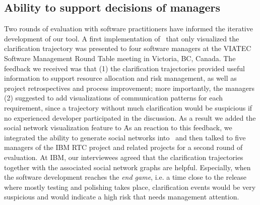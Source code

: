 \subsection{Ability to support decisions of managers}
Two rounds of evaluation with software practitioners have informed the iterative development of our tool. A first implementation of \viss\ that only visualized the clarification trajectory was presented to four software managers at the VIATEC Software Management Round Table meeting in Victoria, BC, Canada. The feedback we received was that (1) the clarification trajectories provided useful information to support resource allocation and risk management, as well as project retrospectives and process improvement; more importantly, the managers (2) suggested to add visualizations of communication patterns for each requirement, since a trajectory without much clarification would be suspicious if no experienced developer participated in the discussion. As a result we added the social network visualization feature to \viss\. 


As an reaction to this feedback, we integrated the ability to generate social networks into \viss\ and then  talked to five managers of the IBM RTC project and related projects for a second round of evaluation.
At IBM, our interviewees agreed that the clarification trajectories together with the associated social network graphs are helpful. 
Especially, when the software development reaches the \emph{end game}, i.e. a time close to the release where mostly testing and polishing takes place, clarification events would be very suspicious and would indicate a high risk that needs management attention. 
